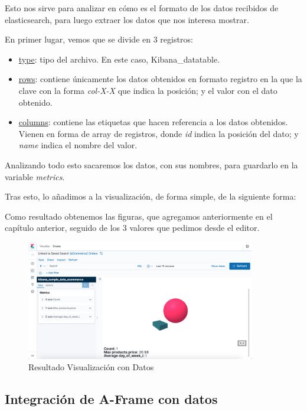 \documentclass[a4paper, 12pt]{book}
\begin{document}
Esto nos sirve para analizar en cómo es el formato de los datos recibidos de elasticsearch, para luego extraer los datos que nos interesa mostrar. 

En primer lugar, vemos que se divide en 3 registros: 
\begin{itemize}
    \item \underline{type}: tipo del archivo. En este caso, Kibana\_datatable.
    \item \underline{rows}: contiene únicamente los datos obtenidos en formato registro en la que la clave con la forma \textit{col-X-X} que indica la posición; y el valor con el dato obtenido.
    \item \underline{columns}: contiene las etiquetas que hacen referencia a los datos obtenidos. Vienen en forma de array de registros, donde \textit{id} indica la posición del dato; y \textit{name} indica el nombre del valor. 
\end{itemize}

Analizando todo esto sacaremos los datos, con sus nombres, para guardarlo en la variable \textit{metrics}.



Tras esto, lo añadimos a la visualización, de forma simple, de la siguiente forma:





Como resultado obtenemos las figuras, que agregamos anteriormente en el capítulo anterior, seguido de los 3 valores que pedimos desde el editor.

\begin{figure}[H]
  \centering
  \includegraphics[width=10cm, keepaspectratio]{img/development/resultado-simple-data.png}
  \caption{Resultado Visualización con Datos}
  \label{fig:simplewithdata}
\end{figure}


\subsection{Integración de A-Frame con datos}
\label{sec:aframecondatos}
\end{document}
